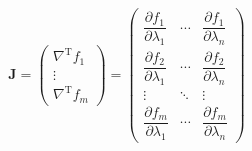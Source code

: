 \documentclass[12pt]{article}
\numberwithin{equation}{section}
\begin{document}
\begin{itemize}
\begin{equation}
		 \mathbf {J} ={\begin{pmatrix}\nabla ^{\mathrm {T} }f_{1}\\\vdots \\\nabla ^{\mathrm {T} }f_{m}\end{pmatrix}}={\begin{pmatrix}{\dfrac {\partial f_{1}}{\partial \lambda_{1}}}&\cdots &{\dfrac {\partial f_{1}}{\partial \lambda_{n}}}\\   \dfrac {\partial f_{2}}{\partial \lambda_{1}}  & \cdots & \dfrac {\partial f_{2}}{\partial \lambda_{n}} \\\vdots &\ddots &\vdots \\{\dfrac {\partial f_{m}}{\partial \lambda_{1}}}&\cdots &{\dfrac {\partial f_{m}}{\partial \lambda_{n}}}\end{pmatrix}}
\end{equation}


\end{itemize}
\end{document}
